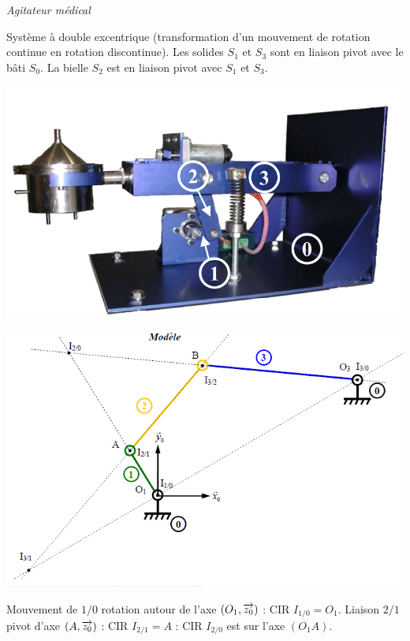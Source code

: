 \documentclass[10pt]{article}
\begin{document}
\begin{exemple}
\textit{Agitateur médical}

Système à double excentrique (transformation d'un mouvement de rotation continue en rotation discontinue). Les solides $S_1$ et $S_3$ sont en liaison pivot avec le bâti $S_0$. La bielle $S_2$ est en liaison pivot avec $S_1$ et $S_3$.

\begin{minipage}[c]{.4\linewidth}
\begin{center}
\includegraphics[width=\textwidth]{images/img6_1}
\end{center}
\end{minipage}\hfill
\begin{minipage}[c]{.5\linewidth}
\begin{center}
\includegraphics[width=\textwidth]{images/img6}
\end{center}
\end{minipage}
Mouvement de $1/0$ rotation autour de l'axe $(O_1,\overrightarrow{z_0})$ : CIR $I_{1/0}=O_1$. 
Liaison $2/1$ pivot d'axe $(A,\overrightarrow{z_0})$ : CIR $I_{2/1}=A$ : CIR $I_{2/0}$ est sur l'axe $(O_1 A)$.


\end{exemple}
\end{document}
